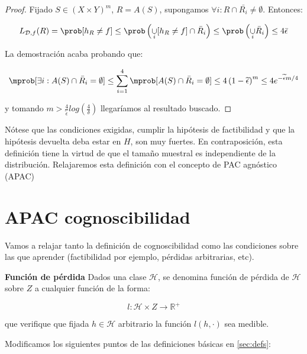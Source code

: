 \begin{example}
\begin{proof}
    Fijado $S\in (X\times Y)^m$, $R=A(S)$, supongamos $\forall i : R \cap \bar{R_i} \neq \emptyset$. Entonces:

    \[L_{\mathcal{D},f}(R) = \prob [h_R \neq f] \le \prob 
    \left(\underset{i}{\cup} [h_R \neq f] \cap \bar{R}_i\right) \le \prob \left(\underset{i}{\cup} 
    \bar{R}_i\right) \le 4 \bar{\epsilon}\]

    La demostración acaba probando que:

    \[\mprob [\exists i : A(S)\cap \bar{R}_i = \emptyset] \le \sum_{i=1}^4 
    \mprob[A(S)\cap \bar{R}_i = \emptyset] \le 4 \left(1-\widetilde{\epsilon} \right)^m \le 4e^{-\widetilde{\epsilon}m/4}\]

    y tomando $m > \frac{4}{\widetilde{\epsilon}} log \left( \frac{4}{\delta} \right)$ llegaríamos al resultado buscado.
    \end{proof}
\end{example}


Nótese que las condiciones exigidas, cumplir la hipótesis de factibilidad y que la hipótesis devuelta deba estar en $H$, 
son muy fuertes. En contraposición, esta definición tiene la virtud de que el tamaño muestral es independiente de la 
distribución. Relajaremos esta definición con el concepto de PAC agnóstico (APAC)


\section{APAC cognoscibilidad}

Vamos a relajar tanto la definición de cognoscibilidad como las condiciones sobre las que aprender 
(factibilidad por ejemplo, pérdidas arbitrarias, etc).

\begin{definition} \textbf{Función de pérdida}
Dados una clase $\mathcal{H}$, se denomina función de pérdida de $\mathcal{H}$ sobre $Z$ 
a cualquier función de la forma:

\[l : \mathcal{H} \times Z \rightarrow \mathbb{R}^{+}\]

que verifique que fijada $h\in \mathcal{H}$ arbitrario la función $l(h, \cdot)$ sea medible.
\end{definition}

Modificamos los siguientes puntos de las definiciones básicas en \ref{sec:defs}:

